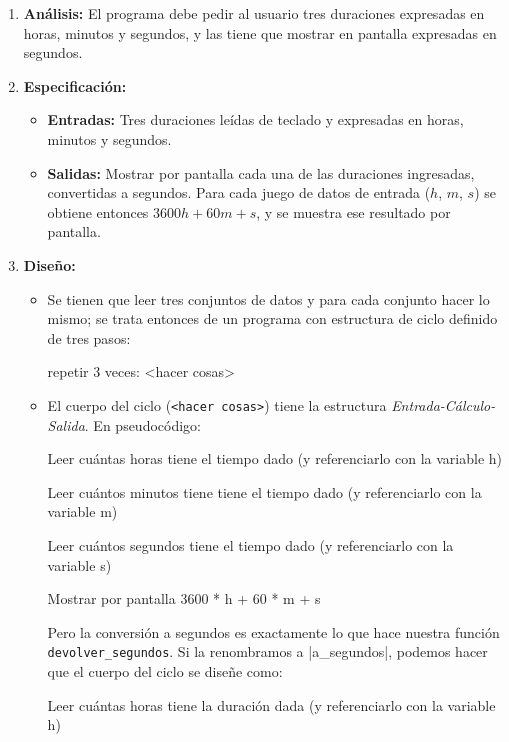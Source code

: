 \begin{enumerate}

\item {\bf Análisis: } El programa debe pedir al usuario tres duraciones
    expresadas en horas, minutos y segundos, y las tiene que mostrar en
    pantalla expresadas en segundos.

\item {\bf Especificación: }
\begin{itemize}
\item {\bf Entradas: } Tres duraciones leídas de teclado y expresadas en horas,
minutos y segundos.
\item {\bf Salidas: } Mostrar por pantalla cada una de las duraciones
    ingresadas, convertidas a segundos.  Para cada juego de datos de entrada
    ($h$, $m$, $s$) se obtiene entonces $3600 h + 60 m + s$, y se muestra
    ese resultado por pantalla.
\end{itemize}

\item {\bf Diseño:}
\begin{itemize}
\item Se tienen que leer tres conjuntos de datos y para cada conjunto hacer lo
mismo; se trata entonces de un programa con estructura de ciclo definido de
tres pasos:

\begin{codigo-nohl-sn}
repetir 3 veces:
    <hacer cosas>
\end{codigo-nohl-sn}

\item El cuerpo del ciclo (\verb+<hacer cosas>+) tiene la estructura
\emph{Entrada-Cálculo-Salida}.  En pseudocódigo:

\begin{codigo-nohl-sn}
Leer cuántas horas tiene el tiempo dado
 (y referenciarlo con la variable h)

Leer cuántos minutos tiene tiene el tiempo dado
 (y referenciarlo con la variable m)

Leer cuántos segundos tiene el tiempo dado
 (y referenciarlo con la variable s)

Mostrar por pantalla 3600 * h + 60 * m + s
\end{codigo-nohl-sn}

Pero la conversión a segundos es exactamente lo que hace nuestra función
\verb+devolver_segundos+. Si la renombramos a |a_segundos|, podemos hacer que
el cuerpo del ciclo se diseñe como:

\begin{codigo-nohl-sn}
Leer cuántas horas tiene la duración dada
 (y referenciarlo con la variable h)


\end{codigo-nohl-sn}
\end{itemize}
\end{enumerate}
